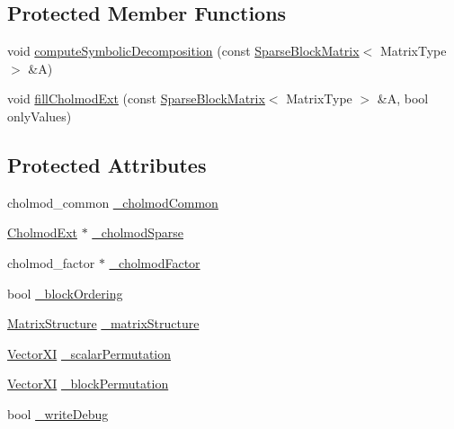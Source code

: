 \subsection*{Protected Member Functions}
\begin{DoxyCompactItemize}
\item 
void \hyperlink{classg2o_1_1LinearSolverCholmod_a40a0f991ae3bb914f2313b55c514640d}{compute\+Symbolic\+Decomposition} (const \hyperlink{classg2o_1_1SparseBlockMatrix}{Sparse\+Block\+Matrix}$<$ Matrix\+Type $>$ \&A)
\item 
void \hyperlink{classg2o_1_1LinearSolverCholmod_a4b1e18e870b5663f45900dea3bba9155}{fill\+Cholmod\+Ext} (const \hyperlink{classg2o_1_1SparseBlockMatrix}{Sparse\+Block\+Matrix}$<$ Matrix\+Type $>$ \&A, bool only\+Values)
\end{DoxyCompactItemize}
\subsection*{Protected Attributes}
\begin{DoxyCompactItemize}
\item 
cholmod\+\_\+common \hyperlink{classg2o_1_1LinearSolverCholmod_ae7def9c6bf341e0d2f3a3936121fefa1}{\+\_\+cholmod\+Common}
\item 
\hyperlink{structg2o_1_1CholmodExt}{Cholmod\+Ext} $\ast$ \hyperlink{classg2o_1_1LinearSolverCholmod_aefbdba58c18dc9eac831eb3d7c24fa18}{\+\_\+cholmod\+Sparse}
\item 
cholmod\+\_\+factor $\ast$ \hyperlink{classg2o_1_1LinearSolverCholmod_a674a54287f98130c4aab303508ab945b}{\+\_\+cholmod\+Factor}
\item 
bool \hyperlink{classg2o_1_1LinearSolverCholmod_a1451c262710d169b6a21e06ca1165337}{\+\_\+block\+Ordering}
\item 
\hyperlink{classg2o_1_1MatrixStructure}{Matrix\+Structure} \hyperlink{classg2o_1_1LinearSolverCholmod_af939e0478ab4fddb708729a8ab3b6560}{\+\_\+matrix\+Structure}
\item 
\hyperlink{namespaceg2o_a2797ddaf7a7a6dc22843a38d34754e55}{Vector\+XI} \hyperlink{classg2o_1_1LinearSolverCholmod_aa195d0f2a09641240e8ab7da8b516460}{\+\_\+scalar\+Permutation}
\item 
\hyperlink{namespaceg2o_a2797ddaf7a7a6dc22843a38d34754e55}{Vector\+XI} \hyperlink{classg2o_1_1LinearSolverCholmod_a6dc3dd0af697846996d6ca72da72ffbd}{\+\_\+block\+Permutation}
\item 
bool \hyperlink{classg2o_1_1LinearSolverCholmod_ab13b752d37f43b2d8e1e4b2c7002b054}{\+\_\+write\+Debug}
\end{DoxyCompactItemize}


